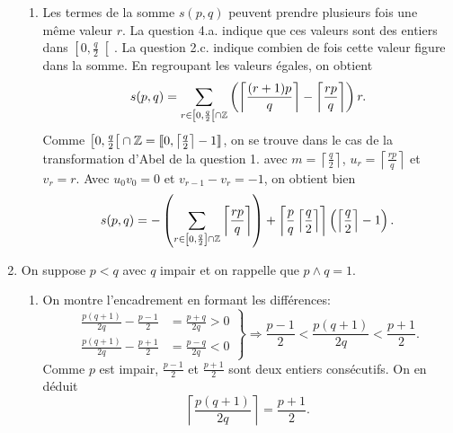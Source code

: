 \begin{enumerate}
\begin{enumerate}
    \item Les termes de la somme $s(p,q)$ peuvent prendre plusieurs fois une même valeur $r$. La question 4.a. indique que ces valeurs sont des entiers dans $\left[0, \frac{q}{2}\right[$. La question 2.c. indique combien de fois cette valeur figure dans la somme. En regroupant les valeurs égales, on obtient
\[
  s(p,q) = \sum_{r \in \left[0, \frac{q}{2}\right[ \cap \mathbb{Z}}\left( \left\lceil \frac{(r+1)p}{q}\right\rceil -\left\lceil \frac{rp}{q}\right\rceil \right)r.
\]
Comme $\left[0, \frac{q}{2}\right[ \cap \mathbb{Z} = \llbracket 0, \left\lceil \frac{q}{2} \right\rceil -1\rrbracket$, on se trouve dans le cas de la transformation d'Abel de la question 1. avec $m = \left\lceil \frac{q}{2}\right\rceil$, $u_r = \left\lceil \frac{rp}{q}\right\rceil$ et $v_r = r$. Avec $u_0v_0 = 0$ et $v_{r-1} - v_r = -1$, on obtient bien
\[
s(p,q) = -\left(\sum_{r \in \left[0, \frac{q}{2}\right] \cap \mathbb{Z}}\left\lceil \frac{rp}{q}\right\rceil \right)
+ \left\lceil \frac{p}{q}\left\lceil \frac{q}{2}\right\rceil\right\rceil \left(\left\lceil \frac{q}{2}\right\rceil -1 \right).  
\]
  \end{enumerate}

  \item On suppose $p<q$ avec $q$ impair et on rappelle que $p\wedge q =1$.
  \begin{enumerate}
    \item On montre l'encadrement en formant les différences:
\[
\left.
\begin{aligned}
\frac{p(q+1)}{2q} - \frac{p-1}{2} &= \frac{p+q}{2q} > 0 \\
\frac{p(q+1)}{2q} - \frac{p+1}{2} &= \frac{p-q}{2q} < 0  
\end{aligned}
\right\rbrace \Rightarrow
\frac{p-1}{2} < \frac{p(q+1)}{2q} < \frac{p+1}{2}.
\]
Comme $p$ est impair, $\frac{p-1}{2}$ et $\frac{p+1}{2}$ sont deux entiers consécutifs. On en déduit
\[
  \left\lceil \frac{p(q+1)}{2q} \right\rceil = \frac{p+1}{2}.
\]


\end{enumerate}
\end{enumerate}
